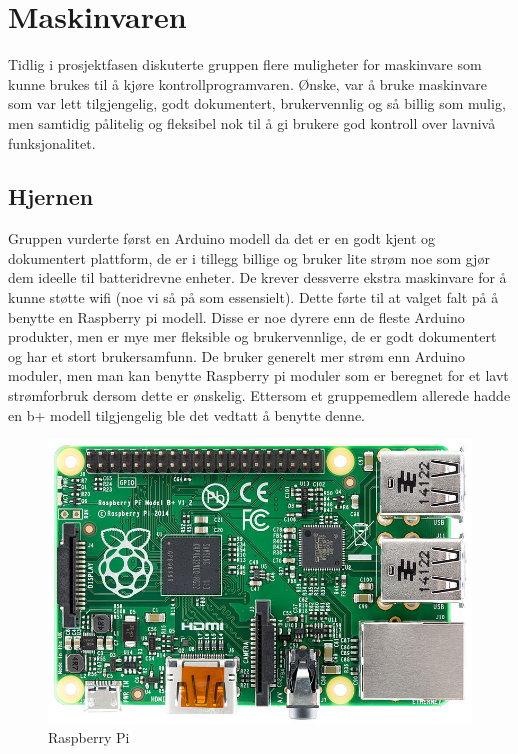 \documentclass[12pt]{report}
\begin{document}
\section{Maskinvaren}
Tidlig i prosjektfasen diskuterte gruppen flere muligheter for maskinvare som kunne brukes til å kjøre kontrollprogramvaren. Ønske, var å bruke maskinvare som var lett tilgjengelig, godt dokumentert, brukervennlig og så billig som mulig, men samtidig pålitelig og fleksibel nok til å gi brukere god kontroll over lavnivå funksjonalitet. 

\subsection{Hjernen}
Gruppen vurderte først en Arduino modell da det er en godt kjent og dokumentert plattform, de er i tillegg billige og bruker lite strøm noe som gjør dem ideelle til batteridrevne enheter. De krever dessverre ekstra maskinvare for å kunne støtte wifi (noe vi så på som essensielt). Dette førte til at valget falt på å benytte en Raspberry pi modell. Disse er noe dyrere enn de fleste Arduino produkter, men er mye mer fleksible og brukervennlige, de er godt dokumentert og har et stort brukersamfunn. De bruker generelt mer strøm enn Arduino moduler, men man kan benytte Raspberry pi moduler som er beregnet for et lavt strømforbruk\cite{RaspberryApluss} dersom dette er ønskelig. Ettersom et gruppemedlem allerede hadde en b+ modell tilgjengelig ble det vedtatt å benytte denne.

\begin{figure}[H]
	\includegraphics[scale=0.47]{imgs/RaspberryPi}
	\centering
	\caption{Raspberry Pi}
	\label{Rasp}
\end{figure}
\end{document}
